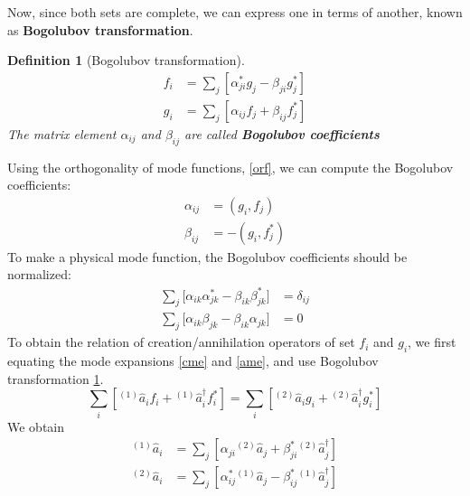 \documentclass[12pt]{article}
\numberwithin{equation}{section}
\theoremstyle{1style}
\newtheorem{definition}[equation]{Definition}
\newcommand{\tbf}[1]{\textbf{#1}}
\begin{document}
Now, since both sets are complete, we can express one in terms of another, known as \tbf{Bogolubov transformation}.
\begin{definition}[Bogolubov transformation]\label{bt}
  \begin{align*}
    f_i & =\sum_j\left[\alpha^*_{ji}g_j-\beta_{ji}g^*_j\right] \\
    g_i & =\sum_j\left[\alpha_{ij}f_j+\beta_{ij}f_j^*\right]
  \end{align*}
  The matrix element \(\alpha_{ij}\) and \(\beta_{ij}\) are called \tbf{Bogolubov coefficients}
\end{definition}
Using the orthogonality of mode functions, \ref{orf}, we can compute the Bogolubov coefficients:
\begin{align}
  \alpha_{ij} & =(g_i,f_j)     \\
  \beta_{ij}  & = -(g_i,f_j^*)
\end{align}
To make a physical mode function, the Bogolubov coefficients should be normalized:
\begin{align}
  \sum_j\bigl[\alpha_{ik}\alpha^*_{jk}-\beta_{ik}\beta^*_{jk}\bigr] & =\delta_{ij} \\
  \sum_j\bigl[\alpha_{ik}\beta_{jk}-\beta_{ik}\alpha_{jk}\bigr]     & =0
\end{align}
To obtain the relation of creation/annihilation operators of set \(f_i\) and \(g_i\),
we first equating the mode expansions \ref{cme} and \ref{ame}, and use Bogolubov transformation \ref{bt}.
\begin{equation}
  \sum_i\left[{}^{(1)}\hat{a}_i f_i+{}^{(1)}\hat{a}_i^\dagger f_i^*\right]=\sum_i\left[{}^{(2)}\hat{{a}}_i g_i+{}^{(2)}\hat{{a}}_i^\dagger g_i^*\right]
\end{equation}
We obtain
\begin{align}
  {}^{(1)}\hat{a}_i       & =\sum_j\left[\alpha_{ji}{}^{(2)}\hat{{a}}_j+\beta^*_{ji}{}^{(2)}\hat{{a}}^{\dagger}_j\right] \\
  {}^{(2)}\hat{{a}}_i & =\sum_j\left[\alpha^*_{ij}{}^{(1)}\hat{a}_j-\beta^*_{ij}{}^{(1)}\hat{a}^{\dagger}_j\right]
\end{align}
\end{document}
